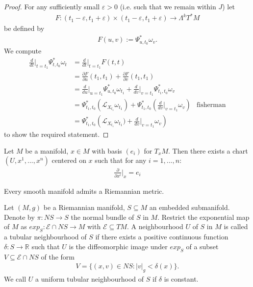 \begin{proof}
For any sufficiently small $\varepsilon > 0$ (i.e. such that we remain within $J$) let
\begin{align*}
F:(t_1-\varepsilon,t_1+\varepsilon)\times(t_1-\varepsilon,t_1+\varepsilon) \to \Lambda^k T^*M
\end{align*}
be defined by
\begin{align*}
F(u,v) := \Psi^*_{u,t_0}\omega_v .
\end{align*}
We compute
\begin{align*}
\frac{d}{dt}\bigg\vert_{t=t_1} \Psi^*_{t,t_0} \omega_t &= \frac{d}{dt}\bigg\vert_{t=t_1} F(t,t) & \\
&= \frac{\partial F}{\partial u}(t_1,t_1) + \frac{\partial F}{\partial v} (t_1,t_1) &  \\
&= \frac{d}{du}\bigg\vert_{u=t_1} \Psi^*_{u,t_0} \omega_{t_1} + \frac{d}{dv} \bigg\vert_{v=t_1} \Psi^*_{t_1,t_0} \omega_v &  \\
&= \Psi^*_{t_1,t_0} (\mathcal{L}_{X_{t_1}} \omega_{t_1}) + \Psi^*_{t_1,t_0} \left( \frac{d}{dv}\bigg\vert_{v=t_1} \omega_v \right) & \text{fisherman} \\
&=  \Psi^*_{t_1,t_0} \left( \mathcal{L}_{X_{t_1}} \omega_{t_1}) +  \frac{d}{dv}\bigg\vert_{v=t_1} \omega_v \right) & 
\end{align*}
to show the required statement.
\end{proof}

\begin{lemma}\label{auxprop1} \cite{ybaehn}
Let $M$ be a manifold, $x \in M$ with basis $(e_i)$ for $T_x M$. Then there exists a chart $(U, x^1, ... ,x^n)$ centered on $x$ such that for any $i = 1, ... , n$:
\begin{align*}
\frac{\partial}{\partial x^i} \bigg\vert_x = e_i
\end{align*}
\end{lemma}

\begin{proposition} \cite{lee1}
Every smooth manifold admits a Riemannian metric.
\end{proposition}

\begin{definition} \cite{lee2}
Let $(M,g)$  be a Riemannian manifold, $S \subseteq M$ an embedded submanifold. Denote by $\pi : NS \to S$ the normal bundle of $S$ in $M$. Restrict the exponential map of $M$ as $exp_S : \mathcal{E} \cap NS \to M$ with $\mathcal{E} \subseteq TM$. A neighbourhood $U$ of $S$ in $M$ is called a tubular neighbourhood of $S$ if there exists a positive continuous function $\delta : S \to \mathbb{R}$ such that $U$ is the diffeomorphic image under $exp_S$ of a subset $V \subseteq \mathcal{E} \cap NS$ of the form 
\begin{align*}
V = \{ (x,v) \in NS : |v|_g < \delta(x) \} .
\end{align*}
We call $U$ a uniform tubular neighbourhood of $S$ if $\delta$ is constant.
\end{definition}

